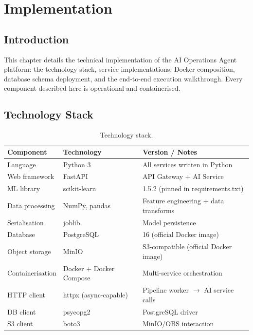 \chapter{Implementation}
\label{ch:implementation}

\section{Introduction}

This chapter details the technical implementation of the AI Operations Agent platform: the technology stack, service implementations, Docker composition, database schema deployment, and the end-to-end execution walkthrough. Every component described here is operational and containerised.

\section{Technology Stack}

\begin{table}[H]
\centering
\caption{Technology stack.}
\label{tab:tech-stack}
\begin{tabularx}{\textwidth}{@{}llX@{}}
\toprule
\textbf{Component} & \textbf{Technology} & \textbf{Version / Notes} \\
\midrule
Language          & Python 3                & All services written in Python \\
Web framework     & FastAPI                 & API Gateway + AI Service \\
ML library        & scikit-learn            & 1.5.2 (pinned in requirements.txt) \\
Data processing   & NumPy, pandas           & Feature engineering + data transforms \\
Serialisation     & joblib                  & Model persistence \\
Database          & PostgreSQL              & 16 (official Docker image) \\
Object storage    & MinIO                   & S3-compatible (official Docker image) \\
Containerisation  & Docker + Docker Compose & Multi-service orchestration \\
HTTP client       & httpx (async-capable)   & Pipeline worker $\to$ AI service calls \\
DB client         & psycopg2                & PostgreSQL driver \\
S3 client         & boto3                   & MinIO/OBS interaction \\
\bottomrule
\end{tabularx}
\end{table}

